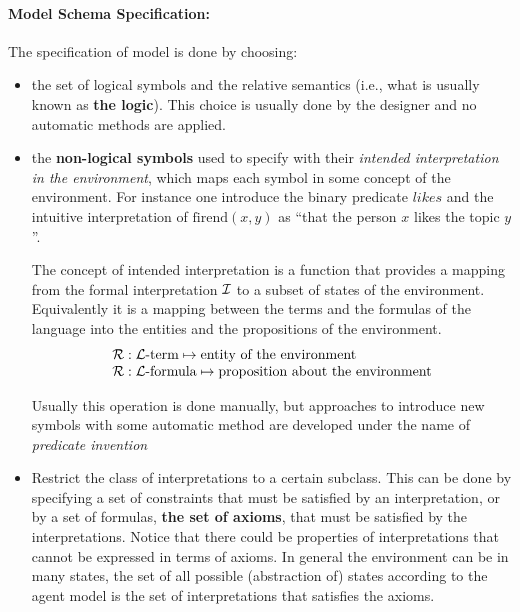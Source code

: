 \paragraph{Model Schema Specification:}
The specification of model is done by choosing: 
\begin{itemize}
\item the set of logical symbols and the relative semantics (i.e.,
  what is usually known as \textbf{the logic}). This choice is usually
  done by the designer and no automatic methods are applied.

\item the \textbf{non-logical symbols} used to specify with their
  \emph{intended interpretation in the environment}, which maps each symbol in
  some concept of the environment.  For instance one introduce the
  binary predicate $\mathit{likes}$ and the intuitive interpretation
  of $\text{firend}(x,y)$ as ``that the person $x$ likes the topic
  $y$''. 

  \begin{definition} 
  The concept of intended interpretation is a function that provides a
  mapping from the formal interpretation $\mathcal{I}$ to a subset of states of
  the environment. Equivalently it is a mapping between the terms and
  the formulas of the language into the entities and the propositions
  of the environment. 
\begin{align}
\label{eq:intended interpretation}
\begin{array}{l}
\mathcal{R} : \text{$\mathcal{L}$-term} \mapsto \text{entity of the environment} \\
\mathcal{R} : \text{$\mathcal{L}$-formula} \mapsto \text{proposition about the environment} 
\end{array}
\end{align}
\end{definition}

  Usually this operation is done manually, but approaches to
  introduce new symbols with some automatic method are developed under
  the name of \emph{predicate invention}

\item Restrict the class of interpretations to a certain
  subclass. This can be done by specifying a set of constraints that
  must be satisfied by an interpretation, or by a set of formulas,
  \textbf{the set of axioms}, that must be satisfied by the
  interpretations. Notice that there could be properties of
  interpretations that cannot be expressed in terms of axioms.  In
  general the environment can be in many states, the set of all
  possible (abstraction of) states according to the agent model is the
  set of interpretations that satisfies the axioms.  
  

\end{itemize}
